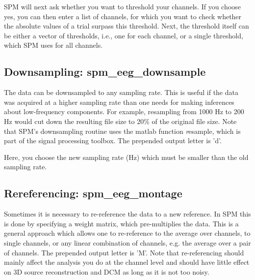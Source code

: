 SPM will next ask whether you want to threshold your channels. If you
choose yes, 
you can then enter a list of channels, for which you want to check whether 
the absolute values of a trial surpass this threshold. Next, the threshold
itself can be either a vector of thresholds, i.e., one for each channel, 
or a single threshold, which SPM uses for all channels.

\subsection{Downsampling: spm\_eeg\_downsample}
The data can be downsampled to any sampling rate. This is useful if
the data was acquired at a higher sampling rate than one needs for 
making inferences about low-frequency components. For example,
resampling from 1000 Hz to 200 Hz would cut down the resulting file
size to 20\% of the original file size. Note that SPM's downsampling
routine uses the matlab function {\textit resample}, which is part of
the signal processing toolbox. The prepended output letter is 'd'.

Here, you choose the new sampling rate (Hz) which must be smaller than the old sampling rate.

\subsection{Rereferencing: spm\_eeg\_montage}
Sometimes it is necessary to re-reference the data to a new
reference. In SPM this is done by specifying a weight matrix, which 
pre-multiplies the data. This is a general approach which 
allows one to re-reference to the average over channels, to single
channels, or any linear combination of channels, e.g. the average over
a pair of channels. The prepended output letter is 'M'. Note that re-referencing
should mainly affect the analysis you do at the channel level and should have little
effect on 3D source reconstruction and DCM as long as it is not too noisy.

